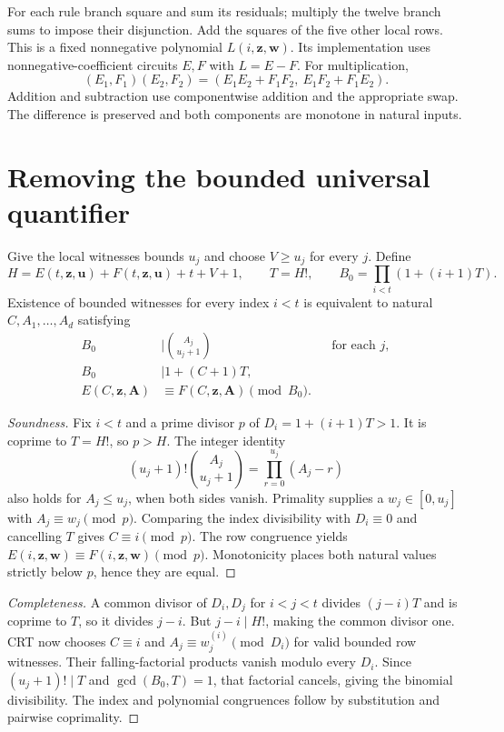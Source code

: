 For each rule branch square and sum its
residuals; multiply the twelve branch sums
to impose their disjunction. Add the
squares of the five other local rows.
This is a fixed nonnegative polynomial
$L(i,\mathbf z,\mathbf w)$.
Its implementation uses nonnegative-coefficient
circuits $E,F$ with $L=E-F$. For multiplication,
\[
 (E_1,F_1)(E_2,F_2)=
 (E_1E_2+F_1F_2,\ E_1F_2+F_1E_2).
\]
Addition and subtraction use componentwise
addition and the appropriate swap. The
difference is preserved and both components
are monotone in natural inputs.

\section{Removing the bounded universal quantifier}
\label{sec:crt}

Give the local witnesses bounds $u_j$ and
choose $V\ge u_j$ for every $j$. Define
\[
 H=E(t,\mathbf z,\mathbf u)+F(t,\mathbf z,\mathbf u)+t+V+1,
 \qquad T=H!,\qquad
 B_0=\prod_{i<t}(1+(i+1)T).
\]
Existence of bounded witnesses for every
index $i<t$ is equivalent to natural
$C,A_1,\ldots,A_d$ satisfying
\begin{align}
 B_0&\mid\binom{A_j}{u_j+1}
             &&\text{for each }j,\label{eq:crt-range}\\
 B_0&\mid1+(C+1)T,\label{eq:crt-index}\\
 E(C,\mathbf z,\mathbf A)&\equiv
       F(C,\mathbf z,\mathbf A)\pmod{B_0}.
       \label{eq:crt-row}
\end{align}

\begin{proof}[Soundness]
Fix $i<t$ and a prime divisor $p$ of
$D_i=1+(i+1)T>1$.
It is coprime to $T=H!$, so $p>H$.
The integer identity
\[
 (u_j+1)!\binom{A_j}{u_j+1}
       =\prod_{r=0}^{u_j}(A_j-r)
\]
also holds for $A_j\le u_j$, when both
sides vanish. Primality supplies a
$w_j\in[0,u_j]$ with $A_j\equiv w_j\pmod p$.
Comparing the index divisibility with
$D_i\equiv0$ and cancelling $T$ gives
$C\equiv i\pmod p$.
The row congruence yields
$E(i,\mathbf z,\mathbf w)\equiv
F(i,\mathbf z,\mathbf w)\pmod p$.
Monotonicity places both natural values
strictly below $p$, hence they are equal.
\end{proof}

\begin{proof}[Completeness]
A common divisor of $D_i,D_j$ for $i<j<t$
divides $(j-i)T$ and is coprime to $T$,
so it divides $j-i$. But $j-i\mid H!$,
making the common divisor one.
CRT now chooses $C\equiv i$ and
$A_j\equiv w_j^{(i)}\pmod{D_i}$
for valid bounded row witnesses.
Their falling-factorial products vanish
modulo every $D_i$. Since
$(u_j+1)!\mid T$ and $\gcd(B_0,T)=1$,
that factorial cancels, giving the
binomial divisibility. The index and
polynomial congruences follow by
substitution and pairwise coprimality.
\end{proof}

